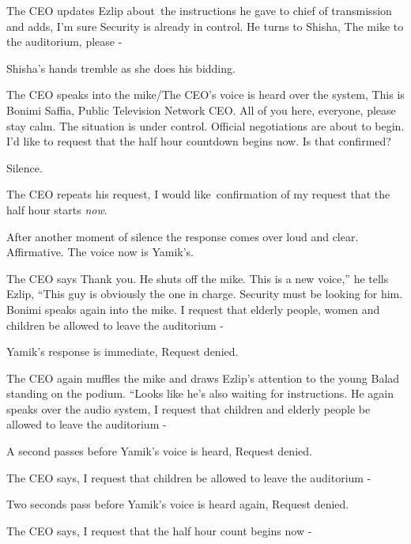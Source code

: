 \documentclass[letterpaper]{article}
\begin{document}
The CEO updates Ezlip about~the instructions he gave to chief of transmission and adds, {\textquotedbl}I'm sure Security
is already in control.{\textquotedbl} He turns to Shisha, {\textquotedbl}The mike to the auditorium, please
-{\textquotedbl} 

Shisha's hands tremble as she does his bidding.

The CEO speaks into the mike/{The CEO's voice is heard over the system},
{\textquotedbl}This is Bonimi Saffia, Public Television Network CEO. All of you here, everyone, please stay calm. The
situation is under control. Official negotiations are about to{ }begin. I'd
like to request that the half hour{ }countdown{ }begins now. Is that
confirmed?{\textquotedbl}

Silence.

The CEO repeats his request, {\textquotedbl}I would like~confirmation of my request that the half hour starts
\textit{now}.{\textquotedbl}

After another moment of silence the response comes over loud and clear. {\textquotedbl}Affirmative.{\textquotedbl} The
voice now is Yamik's.

The CEO says {\textquotedbl}Thank you.{\textquotedbl} He shuts off the mike. {\textquotedbl}This is a new voice,'' he
tells Ezlip, ``This guy is{ }obviously the one in charge. Security must
be{ }looking for him.{\textquotedbl} Bonimi speaks again into the{ }mike.
{\textquotedbl}I request that elderly people, women and children be allowed to leave the auditorium -{\textquotedbl}

Yamik's response is immediate, {\textquotedbl}Request denied.{\textquotedbl}

The CEO again muffles the mike and draws Ezlip's attention to the young Balad standing on the podium. ``Looks like he's
also waiting for instructions.{\textquotedbl} He again speaks over the audio system, {\textquotedbl}I request that
children and elderly people be allowed to leave the auditorium -{\textquotedbl}

A second passes before Yamik's voice is heard, {\textquotedbl}Request denied.{\textquotedbl}

The CEO says, {\textquotedbl}I request that children be allowed to leave the auditorium -{\textquotedbl}

Two seconds pass before Yamik's voice is heard again, {\textquotedbl}Request denied.{\textquotedbl}

The CEO says, {\textquotedbl}I request that the half hour count begins now -{\textquotedbl}
\end{document}
